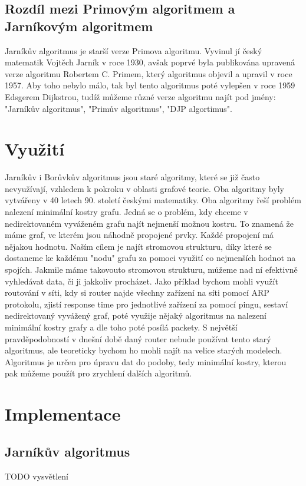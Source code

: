 \documentclass[11pt]{article}
\begin{document}
\subsection{Rozdíl mezi Primovým algoritmem a Jarníkovým algoritmem}
Jarníkův algoritmus je starší verze Primova algoritmu. Vyvinul jí český matematik Vojtěch Jarník v roce 1930,
avšak poprvé byla publikována upravená verze algoritmu Robertem C. Primem, který algoritmus objevil a upravil v roce
1957. Aby toho nebylo málo, tak byl tento algoritmus poté vylepšen v roce 1959 Edsgerem Dijkstrou, tudíž můžeme různé
verze algoritmu najít pod jmény: "Jarníkův algoritmus", "Primův algoritmus", "DJP algortimus".

\pagebreak


\section{Využití}
Jarníkův i Borůvkův algoritmus jsou staré algoritmy, které se již často nevyužívají, vzhledem k pokroku 
v oblasti grafové teorie. Oba algoritmy byly vytvářeny v 40 letech 90. století českými matematiky.
Oba algoritmy řeší problém nalezení minimální kostry grafu. Jedná se o problém, kdy chceme v nedirektovaném
vyváženém grafu najít nejmenší možnou kostru. To znamená že máme graf, ve kterém jsou náhodně propojené prvky.
Každé propojení má nějakou hodnotu. Naším cílem je najít stromovou strukturu, díky které se dostaneme ke každému "nodu"
grafu za pomoci využití co nejmenších hodnot na spojích. Jakmile máme takovouto stromovou strukturu, můžeme nad ní efektivně 
vyhledávat data, či ji jakkoliv procházet. Jako příklad bychom mohli využít routování v síti, kdy si router najde
všechny zařízení na síti pomocí ARP protokolu, zjistí response time pro jednotlivé zařízení za pomocí pingu, 
sestaví nedirektovaný vyvážený graf, poté využije nějaký algoritmus na nalezení minimální kostry grafy a 
dle toho poté posílá packety. S největší pravděpodobností v dnešní době daný router nebude používat tento starý 
algoritmus, ale teoreticky bychom ho mohli najít na velice starých modelech. Algoritmus je určen pro úpravu dat do podoby, tedy minimální kostry, kterou pak můžeme použít pro zrychlení dalších algoritmů.

\pagebreak

\section{Implementace}

\subsection{Jarníkův algoritmus}
TODO vysvětlení
\end{document}
